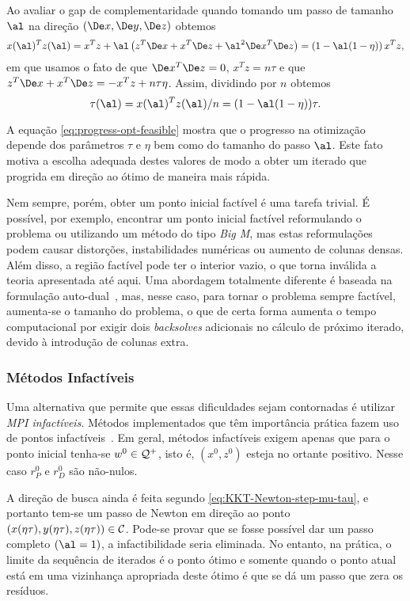 Ao avaliar o gap de complementaridade quando tomando um passo de
tamanho $\al$ na direção $(\Dex, \Dey, \Dez) $ obtemos
\[
x(\al)^Tz(\al) = x^Tz + \al\left(z^T\Dex +  x^T\Dez + \al^2\Dex^T \Dez  
\right) = \left(1 - \al(1 - \eta) \right)x^Tz,
\]
em que usamos o fato de que $\Dex^T \Dez = 0$, $x^Tz = n\tau$ e que $z^T\Dex
+ x^T\Dez = - x^Tz + n\tau\eta $. Assim, dividindo por $n$ obtemos 
\begin{equation}
\label{eq:progress-opt-feasible}
\tau(\al) = x(\al)^Tz(\al)/n = (1 - \al(1-\eta))\tau.
\end{equation}

A equação \eqref{eq:progress-opt-feasible} mostra que  o progresso na
otimização depende dos parâmetros $\tau$ e $\eta$ bem como do tamanho do passo
$\al$. Este fato motiva a escolha adequada destes valores de modo a obter um
iterado que progrida em direção ao ótimo de maneira mais rápida. 




Nem sempre, porém,  obter um ponto inicial factível é uma tarefa trivial.
É possível, por exemplo, encontrar um ponto inicial factível reformulando o
problema  ou utilizando um método do tipo \emph{Big M}, mas estas
reformulações podem causar distorções, instabilidades numéricas ou aumento de
colunas densas.  Além disso, a região factível pode ter o interior vazio, o que
torna inválida a teoria apresentada até aqui. Uma abordagem totalmente diferente
é baseada na formulação
auto-dual~\cite{Ye:1994gq}, mas, nesse caso, para tornar o problema sempre
factível, aumenta-se o tamanho do problema, o que de certa forma aumenta o tempo computacional por exigir dois
\emph{backsolves} adicionais no cálculo de próximo iterado, devido à
introdução de colunas extra.

\subsubsection{Métodos Infactíveis}
Uma alternativa que  permite que essas dificuldades sejam contornadas é utilizar
\emph{\ac{MPI} infactíveis}. Métodos implementados que têm importância
prática fazem uso de pontos
infactíveis~\cite{Gondzio:1996uw,Gertz:2003ji,Czyzyk:1999hk}. Em geral, métodos
infactíveis exigem apenas que para o ponto inicial tenha-se $w^0\in\mathcal{Q}^+$,
isto é, $(x^0,z^0)$ esteja no ortante positivo. Nesse caso  $r_P^0$ e $r_D^0$
são não-nulos.


A direção de busca ainda é feita segundo \eqref{eq:KKT-Newton-step-mu-tau}, e
portanto tem-se um passo de Newton em direção ao ponto
$(x({\eta\tau}),y({\eta\tau}),z({\eta\tau}))\in\mathcal{C}$. Pode-se provar
que se fosse possível dar um passo completo  $(\al=1)$,  a
infactibilidade seria eliminada. No entanto, na prática,  o limite da sequência
de iterados é o ponto ótimo e somente quando o ponto atual está em uma
vizinhança apropriada deste ótimo é que se dá um passo que zera os resíduos.

